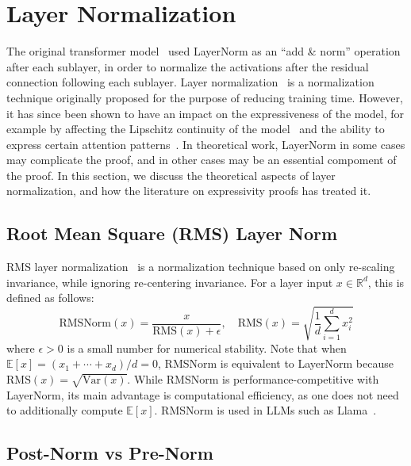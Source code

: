 \chapter{Layer Normalization}
\label{sec:layernorm}

The original transformer model~\citep{vaswani-etal-2017-attention} used LayerNorm as an ``add \& norm'' operation after each sublayer, in order to normalize the activations after the residual connection following each sublayer.
Layer normalization~\citep{ba2016layer} is a normalization technique originally proposed for the purpose of reducing training time.
However, it has since been shown to have an impact on the expressiveness of the model, for example by affecting the Lipschitz continuity of the model~\citep{hahn-2020-theoretical} and the ability to express certain attention patterns~\citep{brody2023expressivity}.
In theoretical work, LayerNorm in some cases may complicate the proof, and in other cases may be an essential compoment of the proof.
In this section, we discuss the theoretical aspects of layer normalization, and how the literature on expressivity proofs has treated it.

\begin{definition}
\end{definition}

\section{Root Mean Square (RMS) Layer Norm}
RMS layer normalization~\citep{zhang2019root} is a normalization technique based on only re-scaling invariance, while ignoring re-centering invariance.
For a layer input \(x \in \mathbb{R}^{d}\), this is defined as follows:
\begin{equation}
    \mathrm{RMSNorm}(x) = \frac{x}{\mathrm{RMS}(x) + \epsilon},
    \quad \mathrm{RMS}(x) = \sqrt{\frac{1}{d} \sum_{i = 1}^{d} x_i ^2}
\end{equation}
where \(\epsilon > 0\) is a small number for numerical stability.
Note that when \(\mathbb{E}[x] = (x_1 + \cdots + x_d)/d = 0\), RMSNorm is equivalent to LayerNorm because \(\mathrm{RMS}(x) = \sqrt{\mathrm{Var}(x)}\).
While RMSNorm is performance-competitive with LayerNorm, its main advantage is computational efficiency, as one does not need to additionally compute \(\mathbb{E}[x]\).
RMSNorm is used in LLMs such as Llama~\citep{touvron2023llama}.

\section{Post-Norm vs Pre-Norm}

